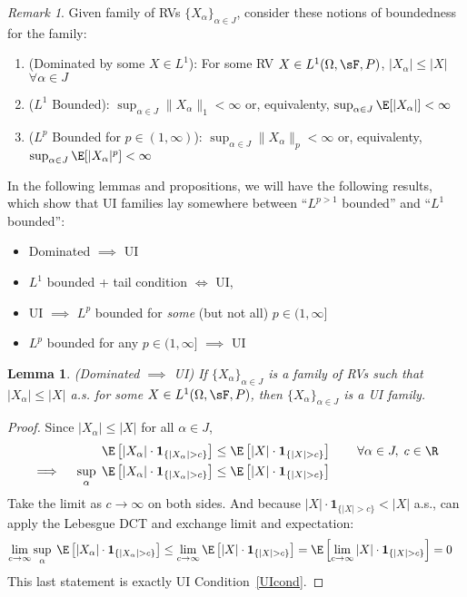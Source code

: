 \documentclass[12pt]{article}
\theoremstyle{plain}
\newtheorem{lem}[thm]{Lemma}
\theoremstyle{definition}
\theoremstyle{remark}
\newtheorem*{rmk}{Remark}
\newcommand{\ra}{\rightarrow}
\newcommand{\one}[1]{\mathbf{1}_{#1}}
\begin{document}
\begin{rmk}
Given family of RVs $\{X_\alpha\}_{\alpha \in J}$,
consider these notions of boundedness for the family:
\begin{enumerate}[label=(\roman*)]
  \item ({Dominated by some $X\in L^1$}):
    For some RV
    $X\in L^1(\Omega,\sF,P)$,
    $|X_\alpha|\leq |X|$ $\forall \alpha\in J$

  \item ({$L^1$ Bounded}):
    $\sup_{\alpha\in J} \lVert X_\alpha\rVert_1<\infty$
    or, equivalenty,
    $\sup_{\alpha\in J} \E[|X_\alpha|]<\infty$

  \item ({$L^p$ Bounded for $p\in(1,\infty)$}):
    $\sup_{\alpha\in J} \lVert X_\alpha\rVert_p<\infty$
    or, equivalenty,
    $\sup_{\alpha\in J} \E[|X_\alpha|^p]<\infty$
\end{enumerate}
In the following lemmas and propositions, we will have the following
results, which show that UI families lay somewhere between ``$L^{p>1}$
bounded'' and ``$L^1$ bounded'':
\begin{itemize}
  \item Dominated $\implies$ UI
  \item $L^1$ bounded + tail condition $\iff$ UI,
  \item UI $\implies$ $L^p$ bounded for \emph{some} (but not all)
    $p \in (1,\infty]$
  \item $L^p$ bounded for any $p\in(1,\infty]$ $\implies$ UI
\end{itemize}
\end{rmk}

\begin{lem}\emph{(Dominated $\implies$ UI)}
\label{lem:UI}
If $\{X_\alpha\}_{\alpha\in J}$ is a family of RVs such that
$|X_\alpha|\leq |X|$ a.s. for some $X\in L^1(\Omega,\sF,P)$,
then $\{X_\alpha\}_{\alpha\in J}$ is a UI family.
\end{lem}
\begin{proof}
Since $|X_\alpha|\leq |X|$ for all $\alpha\in J$,
\begin{align*}
  \E\left[|X_\alpha|\cdot \one{\{|X_\alpha|>c\}}\right]
  &\leq
  \E\left[|X|\cdot \one{\{|X|>c\}}\right]
  \qquad \forall \alpha\in J,\;c\in\R
  \\
  \implies\quad
  \sup_\alpha \; \E\left[|X_\alpha|\cdot \one{\{|X_\alpha|>c\}}\right]
  &\leq
  \E\left[|X|\cdot \one{\{|X|>c\}}\right]
\end{align*}
Take the limit as $c\ra\infty$ on both sides.
And because $|X|\cdot \one{\{|X|>c\}}<|X|$ a.s.,
can apply the Lebesgue DCT and exchange limit and expectation:
\begin{align*}
  \lim_{c\ra\infty}
  \sup_\alpha \; \E\left[|X_\alpha|\cdot \one{\{|X_\alpha|>c\}}\right]
  &\leq
  \lim_{c\ra\infty}
  \E\left[|X|\cdot \one{\{|X|>c\}}\right]
  =
  \E\left[\lim_{c\ra\infty}|X|\cdot \one{\{|X|>c\}}\right]
  = 0
\end{align*}
This last statement is exactly UI Condition~\ref{UIcond}.
\end{proof}
\end{document}
